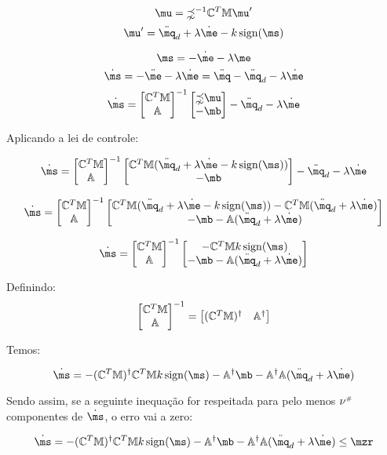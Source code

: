$$ \mu = \mathbb{\zeta}^{-1} \mC^T \mM \mu' $$
$$ \mu' = \ddot{\mq}_d + \lambda \dot{\me} - k  \sign (\ms) $$

$$ \ms = - \dot{\me} - \lambda \me $$
$$ \dot{\ms} = - \ddot{\me} - \lambda \dot{\me} = \ddot{\mq} - \ddot{\mq}_d  - \lambda \dot{\me} $$
$$ \dot{\ms} =  \begin{bmatrix}
\mC^T \mM \\
\mA
\end{bmatrix}^{-1}
\begin{bmatrix}
\mathbb{\zeta} \mu \\
-\mb
\end{bmatrix}
 - \ddot{\mq}_d  - \lambda \dot{\me} $$
 
Aplicando a lei de controle:

$$ \dot{\ms} =  \begin{bmatrix}
\mC^T \mM \\
\mA
\end{bmatrix}^{-1}
\begin{bmatrix}
 \mC^T \mM (\ddot{\mq}_d + \lambda \dot{\me} - k  \sign (\ms)) \\
-\mb
\end{bmatrix}
 - \ddot{\mq}_d  - \lambda \dot{\me} $$
 
 $$ \dot{\ms} =  \begin{bmatrix}
\mC^T \mM \\
\mA
\end{bmatrix}^{-1}
\begin{bmatrix}
 \mC^T \mM (\ddot{\mq}_d + \lambda \dot{\me} - k  \sign (\ms)) -  \mC^T \mM(\ddot{\mq}_d  + \lambda \dot{\me}) \\
-\mb - \mA(\ddot{\mq}_d  + \lambda \dot{\me})
\end{bmatrix} $$

 $$ \dot{\ms} =  \begin{bmatrix}
\mC^T \mM \\
\mA
\end{bmatrix}^{-1}
\begin{bmatrix}
- \mC^T \mM  k  \sign (\ms) \\
-\mb - \mA(\ddot{\mq}_d  + \lambda \dot{\me})
\end{bmatrix} $$

Definindo:
$$\begin{bmatrix}
\mathbb{C}^T \mathbb{M} \\
\mathbb{A}
\end{bmatrix}^{-1}
=
\begin{bmatrix}
(\mathbb{C}^T \mathbb{M})^\dagger & \mathbb{A}^\dagger
\end{bmatrix} $$

Temos:

$$\dot{\ms} = 
- (\mC^T \mM)^\dagger \mC^T \mM  k  \sign (\ms) - \mA^\dagger\mb - \mA^\dagger \mA(\ddot{\mq}_d  + \lambda \dot{\me}) $$

Sendo assim, se a seguinte inequação for respeitada para pelo menos $\nu^{\scriptscriptstyle \#}$ componentes de $\dot{\ms}$, o erro vai a zero:

$$\dot{\ms} = 
- (\mC^T \mM)^\dagger \mC^T \mM  k  \sign (\ms) - \mA^\dagger\mb - \mA^\dagger \mA(\ddot{\mq}_d  + \lambda \dot{\me}) \leq \mzr $$